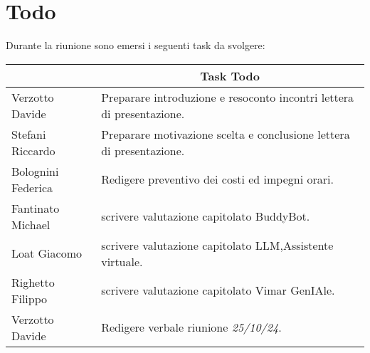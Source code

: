 \section{Todo}

Durante la riunione sono emersi i seguenti task da svolgere:

\vspace{0.5cm}

\begin{table}[htbp]
\begin{tabular}{|p{}|p{}|}
    \hline
    \rowcolor[gray]{0.9}
    \multicolumn{1}{|c|}{\textbf{Assegnatario}} & \multicolumn{1}{|c|}{\textbf{Task Todo}} \\
    \hline
    Verzotto Davide & Preparare introduzione e resoconto incontri lettera di presentazione. \\
    \hline
    Stefani Riccardo & Preparare motivazione scelta e conclusione lettera di presentazione. \\
    \hline
    Bolognini Federica & Redigere preventivo dei costi ed impegni orari. \\
    \hline
    Fantinato Michael & scrivere valutazione capitolato BuddyBot. \\
    \hline
    Loat Giacomo & scrivere valutazione capitolato LLM,Assistente virtuale. \\
    \hline
    Righetto Filippo & scrivere valutazione capitolato  Vimar GenIAle. \\
    \hline 
    Verzotto Davide & Redigere verbale riunione \emph{25/10/24}. \\
    \hline
\end{tabular}
\end{table}
